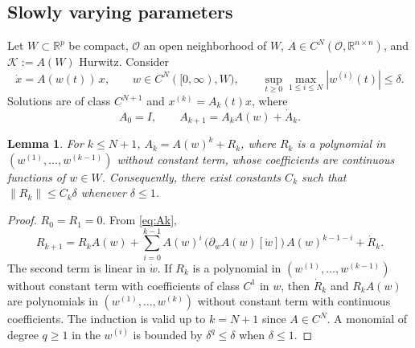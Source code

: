 \documentclass[preprint,12pt,authoryear]{elsarticle}
\newtheorem{lemma}[theorem]{Lemma}
\theoremstyle{definition}
\theoremstyle{remark}
\newcommand{\R}{\mathbb{R}}
\newcommand{\KK}{\mathcal{K}}
\begin{document}
\subsection{Slowly varying parameters}
Let $W\subset\R^p$ be compact, $\mathcal O$ an open neighborhood of $W$, $A\in C^N(\mathcal O,\R^{n\times n})$, and $\KK:=A(W)$ Hurwitz. Consider
\begin{equation}\label{eq:LPV}
\dot x=A(w(t))\,x,\qquad w\in C^N([0,\infty),W),\qquad \sup_{t\ge0}\max_{1\le i\le N}|w^{(i)}(t)|\le\delta .
\end{equation}
Solutions are of class $C^{N+1}$ and $x^{(k)}=A_k(t)x$, where
\begin{equation}\label{eq:Ak}
A_0=I,\qquad A_{k+1}=A_kA(w)+\dot A_k .
\end{equation}
\begin{lemma}\label{lem:Rk}
For $k\le N+1$, $A_k=A(w)^k+R_k$, where $R_k$ is a polynomial in $(w^{(1)},\dots,w^{(k-1)})$ without constant term, whose coefficients are continuous functions of $w\in W$. Consequently, there exist constants $C_k$ such that $\|R_k\|\le C_k\delta$ whenever $\delta\le1$.
\end{lemma}
\begin{proof}
$R_0=R_1=0$. From \eqref{eq:Ak},
\begin{equation}\label{eq:Rk}
R_{k+1}=R_kA(w)+\sum_{i=0}^{k-1}A(w)^i\,\big(\partial_wA(w)[\dot w]\big)\,A(w)^{k-1-i}+\dot R_k .
\end{equation}
The second term is linear in $\dot w$. If $R_k$ is a polynomial in $(w^{(1)},\dots,w^{(k-1)})$ without constant term with coefficients of class $C^1$ in $w$, then $\dot R_k$ and $R_kA(w)$ are polynomials in $(w^{(1)},\dots,w^{(k)})$ without constant term with continuous coefficients. The induction is valid up to $k=N+1$ since $A\in C^N$. A monomial of degree $q\ge1$ in the $w^{(i)}$ is bounded by $\delta^q\le\delta$ when $\delta\le1$.
\end{proof}
\end{document}
